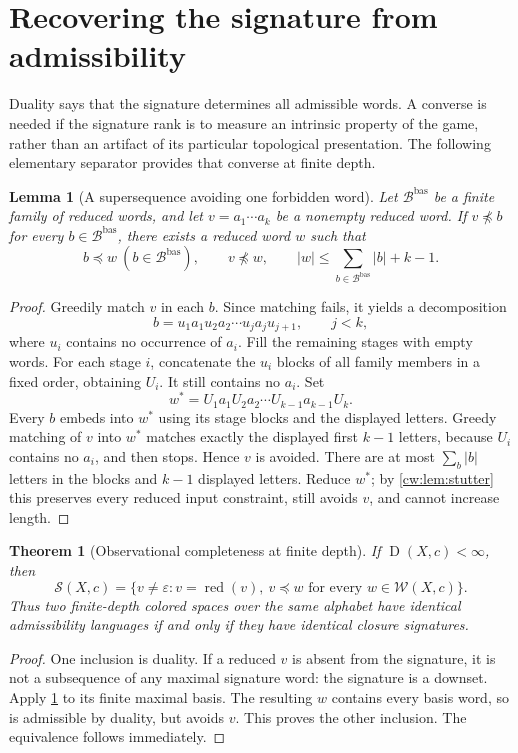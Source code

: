 \documentclass[11pt,letterpaper]{article}
\numberwithin{equation}{section}
\newtheorem{theorem}{Theorem}[section]
\newtheorem{lemma}[lemma]{Lemma}
\theoremstyle{definition}
\theoremstyle{remark}
\theoremstyle{definition}
\newcommand{\eps}{\varepsilon}
\newcommand{\W}{\mathcal W}
\newcommand{\red}{\operatorname{red}}
\newcommand{\depth}{\operatorname{D}}
\newcommand{\len}[1]{\lvert #1\rvert}
\newcommand{\cwSig}{\mathcal S}
\newcommand{\cwBas}{\mathcal B^{\mathrm{bas}}}
\begin{document}
\section{Recovering the signature from admissibility}
\label{cw:sec:recovery}

Duality says that the signature determines all admissible words. A converse
is needed if the signature rank is to measure an intrinsic property of the
game, rather than an artifact of its particular topological presentation.
The following elementary separator provides that converse at finite depth.

\begin{lemma}[A supersequence avoiding one forbidden word]
\label{cw:lem:separator}
Let $\cwBas$ be a finite family of reduced words, and let $v=a_1\cdots a_k$
be a nonempty reduced word. If $v\not\preceq b$ for every $b\in\cwBas$,
there exists a reduced word $w$ such that
\begin{equation}\label{cw:eq:separator}
 b\preceq w\ (b\in\cwBas),\qquad v\not\preceq w,\qquad
 \len w\le\sum_{b\in\cwBas}\len b+k-1.
\end{equation}
\end{lemma}
\begin{proof}
Greedily match $v$ in each $b$. Since matching fails, it yields a decomposition
\[
 b=u_1a_1u_2a_2\cdots u_j a_j u_{j+1},\qquad j<k,
\]
where $u_i$ contains no occurrence of $a_i$. Fill the remaining stages with
empty words. For each stage $i$, concatenate the $u_i$ blocks of all family
members in a fixed order, obtaining $U_i$. It still contains no $a_i$.
Set
\[
 w^*=U_1a_1U_2a_2\cdots U_{k-1}a_{k-1}U_k.
\]
Every $b$ embeds into $w^*$ using its stage blocks and the displayed letters.
Greedy matching of $v$ into $w^*$ matches exactly the displayed first $k-1$
letters, because $U_i$ contains no $a_i$, and then stops. Hence $v$ is avoided.
There are at most $\sum_b\len b$ letters in the blocks and $k-1$
displayed letters. Reduce $w^*$; by \cref{cw:lem:stutter} this preserves every
reduced input constraint, still avoids $v$, and cannot increase length.
\end{proof}

\begin{theorem}[Observational completeness at finite depth]
\label{cw:thm:recovery}
If $\depth(X,c)<\infty$, then
\begin{equation}\label{cw:eq:recover}
 \cwSig(X,c)=\{v\ne\eps:v=\red(v),\ v\preceq w
               \text{ for every }w\in\W(X,c)\}.
\end{equation}
Thus two finite-depth colored spaces over the same alphabet have identical
admissibility languages if and only if they have identical closure signatures.
\end{theorem}
\begin{proof}
One inclusion is duality. If a reduced $v$ is absent from the signature, it
is not a subsequence of any maximal signature word: the signature is a
downset. Apply \cref{cw:lem:separator} to its finite maximal basis. The resulting
$w$ contains every basis word, so is admissible by duality, but avoids $v$.
This proves the other inclusion. The equivalence follows immediately.
\end{proof}
\end{document}
